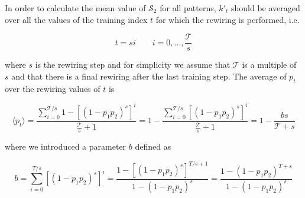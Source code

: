 \documentclass[a4paper, 12pt, twoside, openright]{book}
\newcommand{\T}{\mathcal{T}}
\newcommand{\SII}{\mathcal{S}_\text{2}}
\begin{document}
In order to calculate the mean value of $\SII$ for all patterns, $k'_t$ should be averaged over all the values of the training index $t$ for which the rewiring is performed, i.e.

\begin{equation}
\label{eq:t_rewiring}
t = s i \qquad i = 0, \dots , \frac{\T}{s}
\end{equation}

where $s$ is the rewiring step and for simplicity we assume that $\T$ is a multiple of $s$ and that there is a final rewiring after the last training step.
The average of $p_t$ over the rewiring values of $t$ is

\begin{equation}
\langle p_t \rangle =
\frac{\sum_{i=0}^{\T/s} 1 - [(1 - p_1 p_2)^s]^i }
{\frac{\T}{s} + 1} =
1 - \frac{\sum_{i=0}^{\T/s} [(1 - p_1 p_2)^s]^i }
{\frac{\T}{s} + 1}
= 1 - \frac{b s}{\T + s}
\end{equation}

where we introduced a parameter $b$ defined as

\begin{equation}
b = \sum_{i=0}^{T/s} [(1 - p_1 p_2)^s]^i
= \frac{1 - [(1 - p_1 p_2)^s]^{T/s + 1}}
{1 - (1 - p_1 p_2)^s}
= \frac{1 - (1 - p_1 p_2)^{T + s}}
{1 - (1 - p_1 p_2)^s}
\end{equation}
\end{document}

